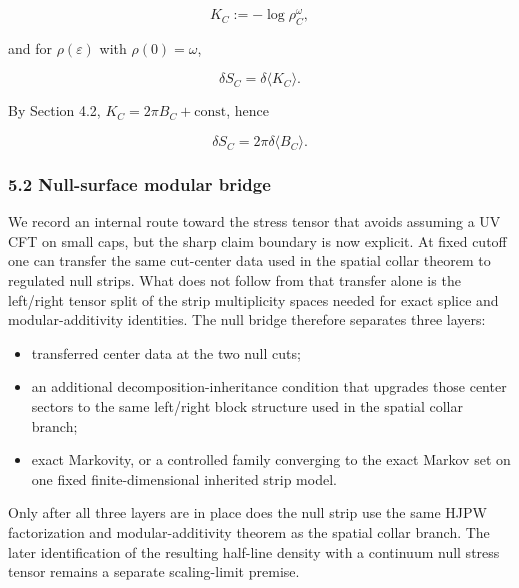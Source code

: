 \[
K_C := -\log \rho_C^{\omega},
\]

and for \(\rho(\varepsilon)\) with \(\rho(0)=\omega\),

\[
\delta S_C = \delta \langle K_C \rangle.
\]

By Section 4.2, \(K_C = 2\pi B_C + \text{const}\), hence

\[
\delta S_C = 2 \pi \delta \langle B_C \rangle.
\]

\subsubsection{5.2 Null-surface modular bridge}\label{52-null-surface-modular-bridge}

We record an internal route toward the stress tensor that avoids assuming a UV CFT on small caps, but the sharp claim boundary is now explicit. At fixed cutoff one can transfer the same cut-center data used in the spatial collar theorem to regulated null strips. What does not follow from that transfer alone is the left/right tensor split of the strip multiplicity spaces needed for exact splice and modular-additivity identities. The null bridge therefore separates three layers:
\begin{itemize}
\tightlist
\item
  transferred center data at the two null cuts;
\item
  an additional decomposition-inheritance condition that upgrades those center sectors to the same left/right block structure used in the spatial collar branch;
\item
  exact Markovity, or a controlled family converging to the exact Markov set on one fixed finite-dimensional inherited strip model.
\end{itemize}
Only after all three layers are in place does the null strip use the same HJPW factorization and modular-additivity theorem as the spatial collar branch. The later identification of the resulting half-line density with a continuum null stress tensor remains a separate scaling-limit premise.

